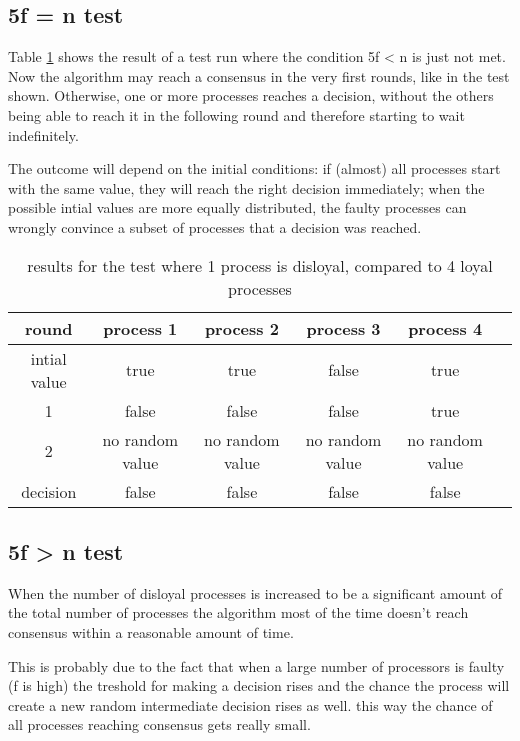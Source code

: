 \subsection{5f = n test}
Table \ref{table:resultsBoundaryDisloyal} shows the result of a test run where the condition 5f < n is just not met. 
Now the algorithm may reach a consensus in the very first rounds, like in the test shown. Otherwise, one or more processes reaches a decision, without the others being able to reach it in the following round and therefore starting to wait indefinitely.

The outcome will depend on the initial conditions: if (almost) all processes start with the same value, they will reach the right decision immediately; when the possible intial values are more equally distributed, the faulty processes can wrongly convince a subset of processes that a decision was reached.

\begin{table}[h]
	\begin{tabular}{ | c | c  | c  | c| c | c |}
		\hline
  		round & process 1 & process 2 & process 3 & process 4  \\
		\hline
 		intial value &  true & true & false & true\\
		\hline
		1  &  false & false & false  & true  \\
		\hline
		2  &  no random value &  no random value & no random value &  no random value \\
		\hline
  		decision  &  false & false & false  & false  \\
		\hline
	\end{tabular}
	\caption{results for the test where 1 process is disloyal, compared to 4 loyal processes}	
	\label{table:resultsBoundaryDisloyal}
\end{table}

\subsection{5f > n test}
 
When the number of disloyal processes is increased to be a significant amount of the total number of processes the algorithm most of the time doesn't reach consensus within a reasonable amount of time. 

This is probably due to the fact that when a large number of processors is faulty (f is high) the treshold for making a decision rises and the chance the process will create a new random intermediate decision rises as well. this way the chance of all processes reaching consensus gets really small.


